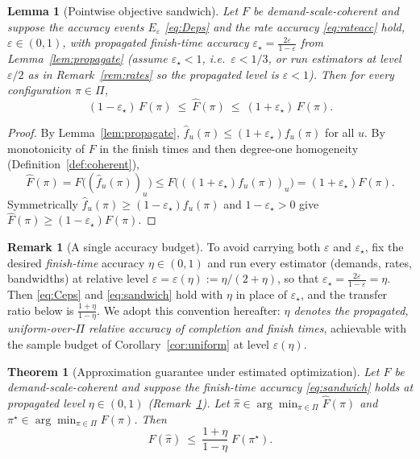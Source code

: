 \documentclass{amsart}
\newtheorem{theorem}{Theorem}
\newtheorem{lemma}{Lemma}
\theoremstyle{definition}
\newtheorem{remark}{Remark}
\begin{document}
\begin{lemma}[Pointwise objective sandwich]\label{lem:sandwich}
Let $F$ be demand-scale-coherent and suppose the accuracy events $E_\varepsilon$
\eqref{eq:Deps} and the rate accuracy \eqref{eq:rateacc} hold,
$\varepsilon\in(0,1)$, with propagated finish-time accuracy
$\varepsilon_\star=\frac{2\varepsilon}{1-\varepsilon}$ from
Lemma~\ref{lem:propagate} (assume $\varepsilon_\star<1$, i.e.\ $\varepsilon<1/3$,
or run estimators at level $\varepsilon/2$ as in Remark~\ref{rem:rates} so the
propagated level is $\varepsilon<1$). Then for every configuration $\pi\in\Pi$,
\begin{equation}\label{eq:sandwich}
(1-\varepsilon_\star)\,F(\pi)\ \le\ \widehat F(\pi)\ \le\ (1+\varepsilon_\star)\,F(\pi).
\end{equation}
\end{lemma}

\begin{proof}
By Lemma~\ref{lem:propagate}, $\widehat f_u(\pi)\le(1+\varepsilon_\star)f_u(\pi)$
for all $u$. By monotonicity of $F$ in the finish times and then degree-one
homogeneity (Definition~\ref{def:coherent}),
\[
\widehat F(\pi)=F\big((\widehat f_u(\pi))_u\big)\le F\big(((1+\varepsilon_\star)f_u(\pi))_u\big)
=(1+\varepsilon_\star)F(\pi).
\]
Symmetrically $\widehat f_u(\pi)\ge(1-\varepsilon_\star)f_u(\pi)$ and
$1-\varepsilon_\star>0$ give $\widehat F(\pi)\ge(1-\varepsilon_\star)F(\pi)$.
\end{proof}

\begin{remark}[A single accuracy budget]\label{rem:budget}
To avoid carrying both $\varepsilon$ and $\varepsilon_\star$, fix the desired
\emph{finish-time} accuracy $\eta\in(0,1)$ and run every estimator
(demands, rates, bandwidths) at relative level
$\varepsilon=\varepsilon(\eta):=\eta/(2+\eta)$, so that
$\varepsilon_\star=\frac{2\varepsilon}{1-\varepsilon}=\eta$. Then \eqref{eq:Ceps}
and \eqref{eq:sandwich} hold with $\eta$ in place of $\varepsilon_\star$, and the
transfer ratio below is $\frac{1+\eta}{1-\eta}$. We adopt this convention
hereafter: \emph{$\eta$ denotes the propagated, uniform-over-$\Pi$ relative
accuracy of completion and finish times}, achievable with the sample budget of
Corollary~\ref{cor:uniform} at level $\varepsilon(\eta)$.
\end{remark}

\begin{theorem}[Approximation guarantee under estimated optimization]\label{thm:main}
Let $F$ be demand-scale-coherent and suppose the finish-time accuracy
\eqref{eq:sandwich} holds at propagated level $\eta\in(0,1)$
(Remark~\ref{rem:budget}). Let $\hat\pi\in\arg\min_{\pi\in\Pi}\widehat F(\pi)$ and
$\pi^\star\in\arg\min_{\pi\in\Pi}F(\pi)$. Then
\begin{equation}\label{eq:approx}
F(\hat\pi)\ \le\ \frac{1+\eta}{1-\eta}\;F(\pi^\star).
\end{equation}
\end{theorem}
\end{document}
